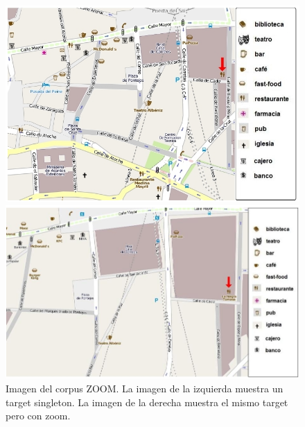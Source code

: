 \begin{figure}
\begin{minipage}[b]{0.48\linewidth}
\centering
\includegraphics[width=\textwidth]{images/corpus/mapa5.png}
\caption{}
\label{mapa5}
\end{minipage}
\hspace*{0cm}
\begin{minipage}[b]{0.55\linewidth}
\centering
\includegraphics[width=\textwidth]{images/corpus/mapa15.png}
\caption{}
\label{mapa6}
\end{minipage}
\caption{Imagen del corpus ZOOM. La imagen de la izquierda muestra un target singleton. La imagen de la derecha muestra el mismo target pero con zoom.}
\end{figure}


